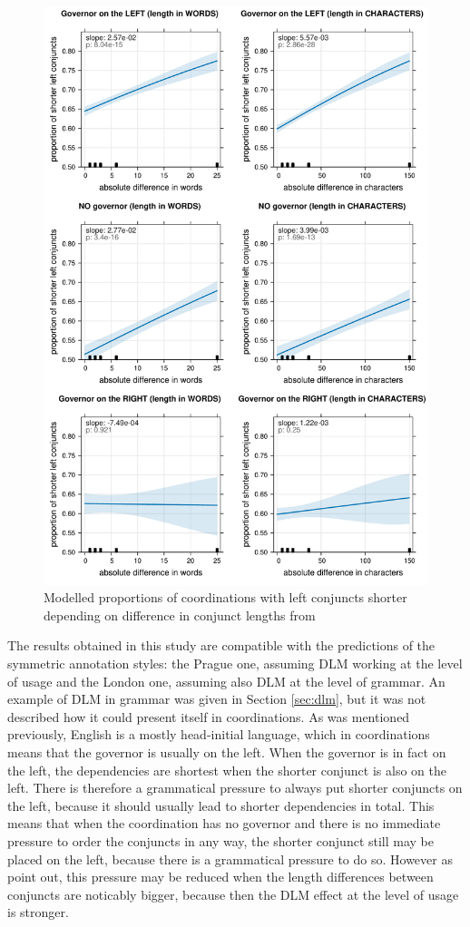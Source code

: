 \begin{figure}[H]
    \includegraphics[scale=0.35]{inputs/ptb-R.pdf}
    \caption{Modelled proportions of coordinations with left conjuncts shorter depending on difference in conjunct lengths from \cite{prz:woz:23}}\label{fig:pw23-results}
\end{figure}

The results obtained in this study are compatible with the predictions of the symmetric annotation styles: the Prague one, assuming DLM working at the level of usage and the London one, assuming also DLM at the level of grammar. An example of DLM in grammar was given in Section \ref{sec:dlm}, but it was not described how it could present itself in coordinations. As was mentioned previously, English is a mostly head-initial language, which in  coordinations means that the governor is usually on the left. When the governor is in fact on the left, the dependencies are shortest when the shorter conjunct is also on the left. There is therefore a grammatical pressure to always put shorter conjuncts on the left, because it should usually lead to shorter dependencies in total. This means that when the coordination has no governor and there is no immediate pressure to order the conjuncts in any way, the shorter conjunct still may be placed on the left, because there is a grammatical pressure to do so.  However as \cite{prz:woz:23} point out, this pressure may be reduced when the length differences between conjuncts are noticably bigger, because then the DLM effect at the level of usage is stronger. 

